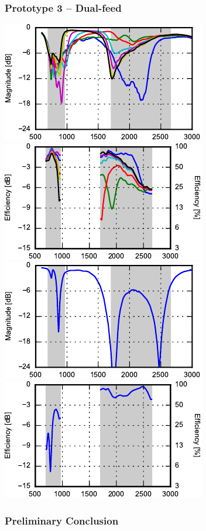\begin{frame}
    \frametitle{Prototype 3 -- Dual-feed}
    \emptyline
    \begin{center}
        \includegraphics{img/soren/proto/design3hv/s11.pdf}
        \includegraphics{img/soren/proto/design3hv/efftop.pdf}\\
        \includegraphics{img/soren/proto/design3hv/s22.pdf}
        \includegraphics{img/soren/proto/design3hv/effside.pdf}
    \end{center}
    \legendfooter
\end{frame}

\begin{frame}
    \frametitle{Preliminary Conclusion}
\end{frame}
